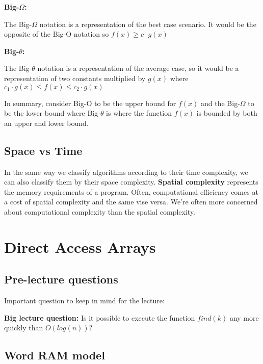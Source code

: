 \documentclass[11pt,a4paper,english]{report}
\begin{document}
\bigskip
\noindent \textbf{Big-$\Omega$:}

\noindent The Big-$\Omega$ notation is a representation of the best case scenario. It would be the opposite of the Big-O notation so $f(x) \geq c\cdot g(x)$

\bigskip

\noindent \textbf{Big-$\theta$:}

\noindent The Big-$\theta$ notation is a representation of the average case, so it would be a representation of two constants multiplied by $g(x)$ where $c_1\cdot g(x) \leq f(x) \leq c_2\cdot g(x)$

\bigskip
\noindent In summary, consider Big-O to be the upper bound for $f(x)$ and the Big-$\Omega$ to be the lower bound where Big-$\theta$ is where the function $f(x)$ is bounded by both an upper and lower bound.

\section{Space vs Time}

In the same way we classify algorithms according to their time complexity, we can also classify them by their space complexity. \textbf{Spatial complexity} represents the memory requirements of a program. Often, computational efficiency comes at a cost of spatial complexity and the same vise versa. We're often more concerned about computational complexity than the spatial complexity.

\chapter{Direct Access Arrays}


\section{Pre-lecture questions}

Important question to keep in mind for the lecture:
\noindent 

\bigskip
\begin{gbox}{}{
\noindent \textbf{Big lecture question:} Is it possible to execute the function $find(k)$ any more quickly than $O(log(n))$?
}\end{gbox}

\section{Word RAM model}
\end{document}
